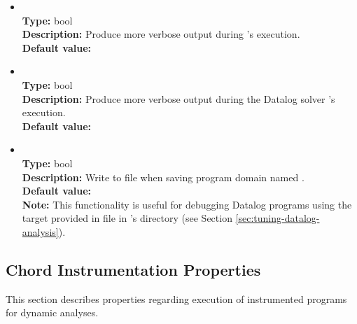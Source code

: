 \begin{itemize}
\item
{} \\
{\bf Type:} bool \\
{\bf Description:} Produce more verbose output during \Chord's execution. \\
{\bf Default value:}  

\item
{} \\
{\bf Type:} bool \\
{\bf Description:} Produce more verbose output during the Datalog solver \bddbddb's execution. \\
{\bf Default value:}  

\item
{} \\
{\bf Type:} bool \\
{\bf Description:} Write to file  when saving program domain named . \\
{\bf Default value:}   \\
{\bf Note:} This functionality is useful for debugging Datalog programs using the  target provided in file  in \Chord's  directory (see Section \ref{sec:tuning-datalog-analysis}).
\end{itemize}

\subsection{Chord Instrumentation Properties}

This section describes properties regarding execution of instrumented programs for dynamic analyses.


